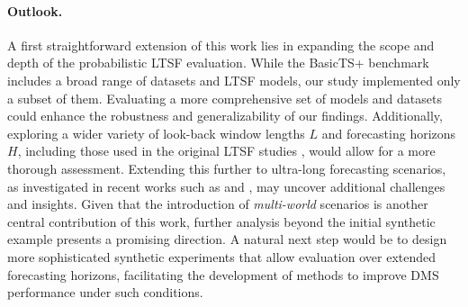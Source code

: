 \documentclass[a4paper,oneside,bibliography=totoc]{scrbook}
\begin{document}
\paragraph{Outlook.}
A first straightforward extension of this work lies in expanding the scope and depth of the probabilistic LTSF evaluation. While the BasicTS+ benchmark \cite{shao_exploring_2025} includes a broad range of datasets and LTSF models, our study implemented only a subset of them. Evaluating a more comprehensive set of models and datasets could enhance the robustness and generalizability of our findings. Additionally, exploring a wider variety of look-back window lengths $L$ and forecasting horizons $H$, including those used in the original LTSF studies \cite{zhou_informer_2021, nie_time_2022}, would allow for a more thorough assessment. Extending this further to ultra-long forecasting scenarios, as investigated in recent works such as \citet{jia_witran_2023} and \citet{shang_ada-mshyper_2024}, may uncover additional challenges and insights.
Given that the introduction of \textit{multi-world} scenarios is another central contribution of this work, further analysis beyond the initial synthetic example presents a promising direction. A natural next step would be to design more sophisticated synthetic experiments that allow evaluation over extended forecasting horizons, facilitating the development of methods to improve DMS performance under such conditions. 
\end{document}
